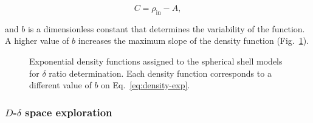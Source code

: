 \documentclass[extra, referee]{gji}
\begin{document}
\begin{equation}
    C = \rho_\text{in} - A,
\end{equation}

\noindent and $b$ is a dimensionless
constant that determines the variability of the function.
A higher value of $b$ increases the maximum slope of the density function
(Fig.~\ref{fig:exp-densities}).

\begin{figure}
\centering
{}
\caption{
    Exponential density functions assigned to the spherical shell models for
    $\delta$ ratio determination.
    Each density function corresponds to a different value of $b$ on
    Eq.~\ref{eq:density-exp}.
}
\label{fig:exp-densities}
\end{figure}


\subsubsection{$D$-$\delta$ space exploration}
\end{document}
